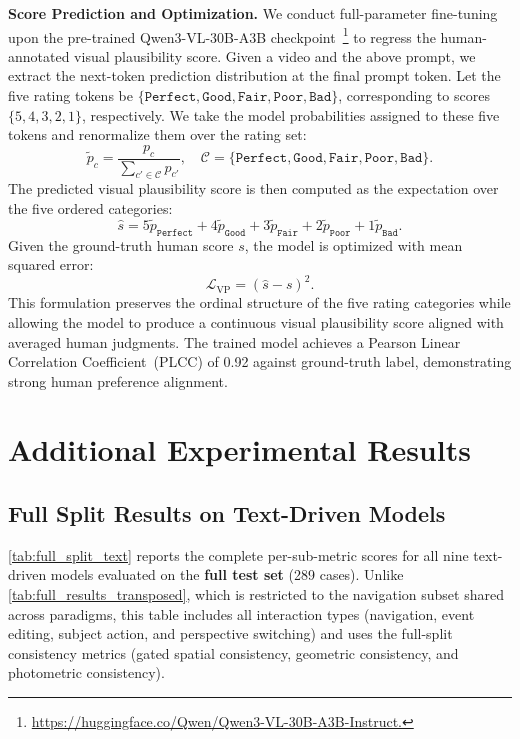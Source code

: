 \documentclass{llmxive}
\providecommand{\myparagraph}[1]{\vspace{-0.1em}\noindent\textbf{#1}\hspace{0.3em}}
\providecommand{\numvideo}{289\xspace}
\begin{document}
\myparagraph{Score Prediction and Optimization.}
We conduct full-parameter fine-tuning upon the pre-trained Qwen3-VL-30B-A3B checkpoint~\footnote{\url{https://huggingface.co/Qwen/Qwen3-VL-30B-A3B-Instruct.}} to regress the human-annotated visual plausibility score. Given a video and the above prompt, we extract the next-token prediction distribution at the final prompt token. Let the five rating tokens be
\(\{\texttt{Perfect}, \texttt{Good}, \texttt{Fair}, \texttt{Poor}, \texttt{Bad}\}\),
corresponding to scores \(\{5,4,3,2,1\}\), respectively. We take the model probabilities assigned to these five tokens and renormalize them over the rating set:
\[
\tilde{p}_c =
\frac{p_c}{\sum_{c' \in \mathcal{C}} p_{c'}},
\quad
\mathcal{C}=\{\texttt{Perfect}, \texttt{Good}, \texttt{Fair}, \texttt{Poor}, \texttt{Bad}\}.
\]
The predicted visual plausibility score is then computed as the expectation over the five ordered categories:
\[
\hat{s}
=
5\tilde{p}_{\texttt{Perfect}}
+4\tilde{p}_{\texttt{Good}}
+3\tilde{p}_{\texttt{Fair}}
+2\tilde{p}_{\texttt{Poor}}
+1\tilde{p}_{\texttt{Bad}}.
\]
Given the ground-truth human score \(s\), the model is optimized with mean squared error:
\[
\mathcal{L}_{\mathrm{VP}} = (\hat{s} - s)^2.
\]
This formulation preserves the ordinal structure of the five rating categories while allowing the model to produce a continuous visual plausibility score aligned with averaged human judgments. The trained model achieves a Pearson Linear Correlation Coefficient~(PLCC) of 0.92 against ground-truth label, demonstrating strong human preference alignment.

\section{Additional Experimental Results}
\label{app:results}

\subsection{Full Split Results on Text-Driven Models}
\label{app:full_split_text}

\cref{tab:full_split_text} reports the complete per-sub-metric scores for all nine text-driven models evaluated on the \textbf{full test set} (\numvideo cases). Unlike \cref{tab:full_results_transposed}, which is restricted to the navigation subset shared across paradigms, this table includes all interaction types (navigation, event editing, subject action, and perspective switching) and uses the full-split consistency metrics (gated spatial consistency, geometric consistency, and photometric consistency).
\end{document}
